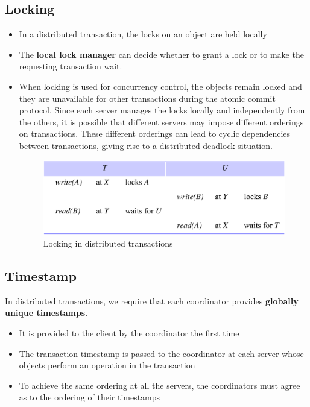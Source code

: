 \subsection{Locking}
\begin{itemize}
    \item In a distributed transaction, the locks on an object are held locally
    \item The \textbf{local lock manager} can decide whether to grant a lock or to make the requesting transaction wait.
    \item When locking is used for concurrency control, the objects remain locked and they are unavailable for other transactions during the atomic commit protocol. Since each server manages the locks locally and independently from the others, it is possible that different servers may impose different orderings on transactions. These different orderings can lead to cyclic dependencies between transactions, giving rise to a distributed deadlock situation.
    
    \begin{figure}[!h]
    \centering
    \includegraphics[width=.60\linewidth]{images/DistributedTransactions/locking.png}
    \caption{Locking in distributed transactions}
    \end{figure}
    
\end{itemize}

\subsection{Timestamp}
In distributed transactions, we require that each coordinator provides \textbf{globally unique timestamps}.
\begin{itemize}
    \item It is provided to the client by the coordinator the first time
    \item The transaction timestamp is passed to the coordinator at each server whose objects perform an operation in the transaction
    \item To achieve the same ordering at all the servers, the coordinators must agree as to the ordering of their timestamps
\end{itemize}

